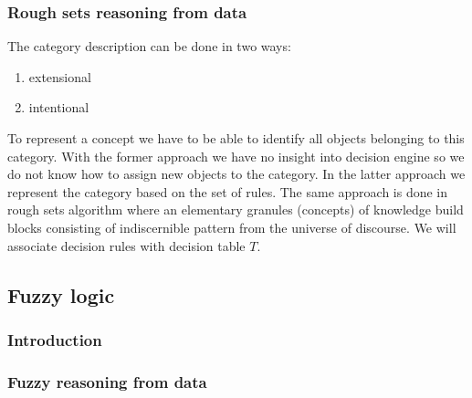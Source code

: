 \subsubsection{Rough sets reasoning from data}
The category description can be done in two ways:
\begin{enumerate}
    \item extensional
    \item intentional
\end{enumerate}
To represent a concept we have to be able to identify 
all objects belonging to this category. 
With the former approach we have no insight 
into decision engine so we do not know how 
to assign new objects to the category. In 
the latter approach we represent the category 
based on the set of rules. The same approach 
is done in rough sets algorithm where an elementary 
granules (concepts) of knowledge build blocks consisting 
of indiscernible pattern from the universe of discourse. 
We will associate decision rules with decision table $T$.

\subsection{Fuzzy logic}
\label{cha:Fuzzy_logic}
\subsubsection{Introduction}
\subsubsection{Fuzzy reasoning from data}
